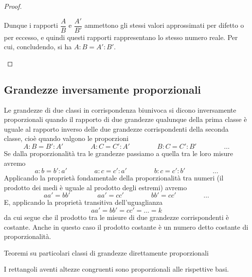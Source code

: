\begin{proof}
\begin{itemize*}
Dunque i rapporti $\dfrac{A}{B}$ e $\dfrac{A'}{B'}$ ammettono gli stessi valori approssimati per difetto o per eccesso, e quindi questi rapporti rappresentano lo stesso numero reale. Per cui, concludendo, si ha $A : B = A' : B'$.
\end{itemize*}
\end{proof}

\subsection{Grandezze inversamente proporzionali}

Le grandezze di due classi in corrispondenza biunivoca si dicono inversamente proporzionali quando il rapporto di due grandezze qualunque della prima classe è uguale al rapporto inverso delle due grandezze corrispondenti della seconda classe, cioè quando valgono le proporzioni
\[A : B = B' : A'\qquad\qquad A : C = C' : A'\qquad\qquad B : C = C' : B'\qquad\qquad \ldots{}\]
Se dalla proporzionalità tra le grandezze passiamo a quella tra le loro misure avremo
\[a : b = b' : a'\qquad\qquad a : c = c' : a'\qquad\qquad b : c = c' : b'\qquad\qquad \ldots{}\]
Applicando la proprietà fondamentale della proporzionalità tra numeri (il prodotto dei medi è uguale al prodotto degli estremi) avremo
\[aa' = bb'\qquad\qquad aa' = cc'\qquad\qquad bb' = cc'\qquad\qquad \ldots{}\]
E, applicando la proprietà transitiva dell'uguaglianza
\[aa' = bb' = cc' = \ldots{} =k\]
da cui segue che il prodotto tra le misure di due grandezze corrispondenti è costante. Anche in questo caso il prodotto costante è un numero detto costante di proporzionalità.

Teoremi su particolari classi di grandezze direttamente proporzionali
\begin{teorema}\label{teo:6.2}
I rettangoli aventi altezze congruenti sono proporzionali alle rispettive basi.
\end{teorema}

